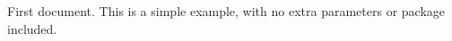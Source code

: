 \documentclass{article}
\begin{document}
First document. This is a simple example, with no extra parameters or package included.
\end{document}
